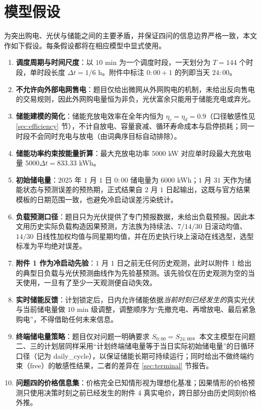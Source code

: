\section{模型假设}

为突出购电、光伏与储能之间的主要矛盾，并保证四问的信息边界严格一致，本文作如下假设。每条假设都将在相应模型中显式使用。

\begin{enumerate}[label=\arabic*., itemsep=2pt, topsep=3pt]
	\item \textbf{调度周期与时间尺度}：以 $10$ min 为一个调度时段，一天划分为 $T=144$ 个时段，单时段长度 $\Delta t=1/6$ h。附件中标注 $0{:}00{+}1$ 的列即当天 $24{:}00$。
	\item \textbf{不允许向外部电网售电}：题目仅给出微网从外网购电的机制，未给出反向售电的交易规则，因此外网购电量恒为非负，光伏富余只能用于储能充电或弃光。
	\item \textbf{储能建模的简化}：储能充放电效率在全年内恒为 $\eta_c=\eta_d=0.9$（口径敏感性见 \ref{sec:efficiency} 节），不计自放电、容量衰减、循环寿命成本与启停损耗；同一时段不会同时充电与放电（由词典序目标自动排除）。
	\item \textbf{储能功率约束按能量折算}：最大充放电功率 $5000$ kW 对应单时段最大充放电量 $5000\Delta t=833.33$ kWh。
	\item \textbf{初始储电量}：$2025$ 年 $1$ 月 $1$ 日 $0{:}00$ 储电量为 $6000$ kWh；$1$ 月 $31$ 天作为储能状态与预测误差的预热期，正式结果自 $2$ 月 $1$ 日起输出，这既与官方结果模板的日期范围一致，也避免冷启动误差污染统计。
	\item \textbf{负载预测口径}：题目只为光伏提供了专门预报数据，未给出负载预报。因此本文用历史实际负载构造因果预测，方法族为持续法、$7/14/30$ 日滚动均值、$14/30$ 日线性加权均值与同星期均值，并在历史执行块上滚动在线选型，选型标准为平均绝对误差。
	\item \textbf{附件 1 作为冷启动先验}：$1$ 月 $1$ 日之前无任何历史观测，此时以附件 1 给出的典型日负载与光伏预测曲线作为先验基预测。该先验仅在历史观测为空的当天使用，一旦有了至少一天观测便自动失效。
	\item \textbf{实时储能反馈}：计划锁定后，日内允许储能依据\emph{当前时刻已经发生的}真实光伏与当前储电量做 $10$ min 级调整，调整顺序为“先撤充电、再增放电、最后紧急购电”，不得借助任何未来信息。
	\item \textbf{终端储电量策略}：题目仅对问题一明确要求 $S_{0{:}00}=S_{24{:}00}$。本文主模型在问题二、三的计划层同样采用“计划终端储电量等于当日实际初始储电量”的日循环口径（记为 daily\_cycle），以保证储能长期可持续运行；同时给出不做终端约束（free）的敏感性结果，二者的差异在 \ref{sec:terminal} 节报告。
	\item \textbf{问题四的价格信息集}：价格完全已知情形视为理想化基准；因果情形的价格预测只使用决策时刻之前已经发生的附件 4 真实电价，跨日部分由历史同刻价格外推。
\end{enumerate}

